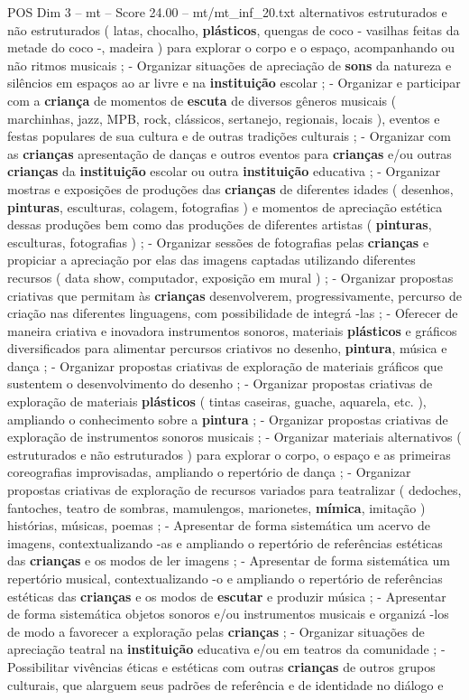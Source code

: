 \begin{textsample}{POS Dim 3 – mt – Score 24.00 – mt/mt\_inf\_20.txt}
alternativos estruturados e não estruturados ( latas, chocalho, \textbf{plásticos}, quengas de coco - vasilhas feitas da metade do coco -, madeira ) para explorar o corpo e o espaço, acompanhando ou não ritmos musicais ; - Organizar situações de apreciação de \textbf{sons} da natureza e silêncios em espaços ao ar livre e na \textbf{instituição} escolar ; - Organizar e participar com a \textbf{criança} de momentos de \textbf{escuta} de diversos gêneros musicais ( marchinhas, jazz, MPB, rock, clássicos, sertanejo, regionais, locais ), eventos e festas populares de sua cultura e de outras tradições culturais ; - Organizar com as \textbf{crianças} apresentação de danças e outros eventos para \textbf{crianças} e/ou outras \textbf{crianças} da \textbf{instituição} escolar ou outra \textbf{instituição} educativa ; - Organizar mostras e exposições de produções das \textbf{crianças} de diferentes idades ( desenhos, \textbf{pinturas}, esculturas, colagem, fotografias ) e momentos de apreciação estética dessas produções bem como das produções de diferentes artistas ( \textbf{pinturas}, esculturas, fotografias ) ; - Organizar sessões de fotografias pelas \textbf{crianças} e propiciar a apreciação por elas das imagens captadas utilizando diferentes recursos ( data show, computador, exposição em mural ) ; - Organizar propostas criativas que permitam às \textbf{crianças} desenvolverem, progressivamente, percurso de criação nas diferentes linguagens, com possibilidade de integrá -las ; - Oferecer de maneira criativa e inovadora instrumentos sonoros, materiais \textbf{plásticos} e gráficos diversificados para alimentar percursos criativos no desenho, \textbf{pintura}, música e dança ; - Organizar propostas criativas de exploração de materiais gráficos que sustentem o desenvolvimento do desenho ; - Organizar propostas criativas de exploração de materiais \textbf{plásticos} ( tintas caseiras, guache, aquarela, etc. ), ampliando o conhecimento sobre a \textbf{pintura} ; - Organizar propostas criativas de exploração de instrumentos sonoros musicais ; - Organizar materiais alternativos ( estruturados e não estruturados ) para explorar o corpo, o espaço e as primeiras coreografias improvisadas, ampliando o repertório de dança ; - Organizar propostas criativas de exploração de recursos variados para teatralizar ( dedoches, fantoches, teatro de sombras, mamulengos, marionetes, \textbf{mímica}, imitação ) histórias, músicas, poemas ; - Apresentar de forma sistemática um acervo de imagens, contextualizando -as e ampliando o repertório de referências estéticas das \textbf{crianças} e os modos de ler imagens ; - Apresentar de forma sistemática um repertório musical, contextualizando -o e ampliando o repertório de referências estéticas das \textbf{crianças} e os modos de \textbf{escutar} e produzir música ; - Apresentar de forma sistemática objetos sonoros e/ou instrumentos musicais e organizá -los de modo a favorecer a exploração pelas \textbf{crianças} ; - Organizar situações de apreciação teatral na \textbf{instituição} educativa e/ou em teatros da comunidade ; - Possibilitar vivências éticas e estéticas com outras \textbf{crianças} de outros grupos culturais, que alarguem seus padrões de referência e de identidade no diálogo e 
\end{textsample}
